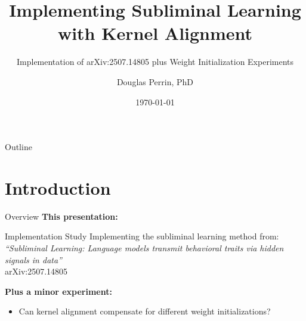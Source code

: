 \documentclass{beamer}
\title[Subliminal Learning]{Implementing Subliminal Learning with Kernel Alignment}
\subtitle{Implementation of arXiv:2507.14805 plus Weight Initialization Experiments}
\author{Douglas Perrin, PhD}
\institute{Group Presentation}
\date{\today}
\begin{document}
\frame{\titlepage}

\begin{frame}{Outline}
\tableofcontents
\end{frame}

\section{Introduction}

\begin{frame}{Overview}
\textbf{This presentation:}

\vspace{1em}

\begin{block}{Implementation Study}
Implementing the subliminal learning method from:\\
\textit{``Subliminal Learning: Language models transmit behavioral traits via hidden signals in data''}\\
arXiv:2507.14805
\end{block}

\vspace{1em}

\textbf{Plus a minor experiment:}
\begin{itemize}
    \item Can kernel alignment compensate for different weight initializations?
\end{itemize}

\end{frame}
\end{document}
